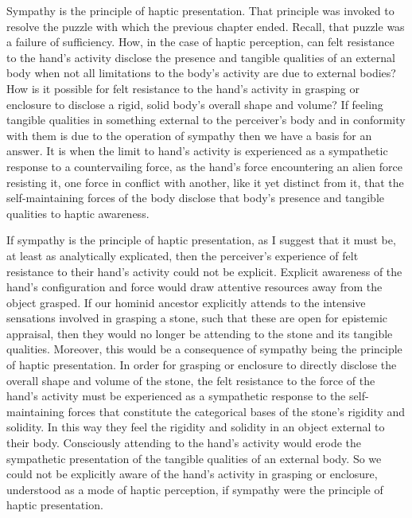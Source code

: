 Sympathy is the principle of haptic presentation. That principle was invoked to resolve the puzzle with which the previous chapter ended. Recall, that puzzle was a failure of sufficiency. How, in the case of haptic perception, can felt resistance to the hand's activity disclose the presence and tangible qualities of an external body when not all limitations to the body's activity are due to external bodies? How is it possible for felt resistance to the hand’s activity in grasping or enclosure to disclose a rigid, solid body’s overall shape and volume? If feeling tangible qualities in something external to the perceiver’s body and in conformity with them is due to the operation of sympathy then we have a basis for an answer. It is when the limit to hand’s activity is experienced as a sympathetic response to a countervailing force, as the hand’s force encountering an alien force resisting it, one force in conflict with another, like it yet distinct from it, that the self-maintaining forces of the body disclose that body’s presence and tangible qualities to haptic awareness.

If sympathy is the principle of haptic presentation, as I suggest that it must be, at least as analytically explicated, then the perceiver's experience of felt resistance to their hand's activity could not be explicit. Explicit awareness of the hand's configuration and force would draw attentive resources away from the object grasped. If our hominid ancestor explicitly attends to the intensive sensations involved in grasping a stone, such that these are open for epistemic appraisal, then they would no longer be attending to the stone and its tangible qualities. Moreover, this would be a consequence of sympathy being the principle of haptic presentation. In order for grasping or enclosure to directly disclose the overall shape and volume of the stone, the felt resistance to the force of the hand's activity must be experienced as a sympathetic response to the self-maintaining forces that constitute the categorical bases of the stone's rigidity and solidity. In this way they feel the rigidity and solidity in an object external to their body. Consciously attending to the hand's activity would erode the sympathetic presentation of the tangible qualities of an external body. So we could not be explicitly aware of the hand's activity in grasping or enclosure, understood as a mode of haptic perception, if sympathy were the principle of haptic presentation.

